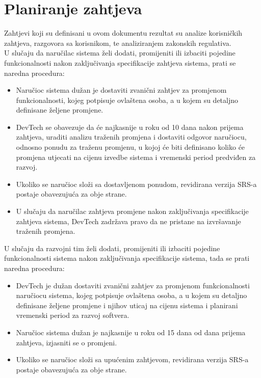 \section{Planiranje zahtjeva}
Zahtjevi koji su definisani u ovom dokumentu rezultat su analize korisničkih zahtjeva, razgovora sa korisnikom, te analiziranjem zakonskih regulativa. \\
U slučaju da naručilac sistema želi dodati, promijeniti ili izbaciti pojedine funkcionalnosti nakon zaključivanja specifikacije zahtjeva sistema, prati se naredna procedura:
\begin{itemize}
\item Naručioc sistema dužan je dostaviti zvanični zahtjev za promjenom funkcionalnosti, kojeg potpisuje ovlaštena osoba, a u kojem su detaljno definisane željene promjene.
\item DevTech se obavezuje da će najkasnije u roku od 10 dana nakon prijema zahtjeva, uraditi analizu traženih promjena i dostaviti odgovor naručiocu, odnosno ponudu za traženu promjenu, u kojoj će biti definisano koliko će promjena utjecati na cijenu izvedbe sistema i vremenski period predviđen za razvoj.
\item Ukoliko se naručioc složi sa dostavljenom ponudom, revidirana verzija SRS-a postaje obavezujuća za obje strane.
\item U slučaju da naručilac zahtjeva promjene nakon zaključivanja specifikacije zahtjeva sistema, DevTech zadržava pravo da ne pristane na izvršavanje traženih promjena.
\end{itemize}
U slučaju da razvojni tim želi dodati, promijeniti ili izbaciti pojedine funkcionalnosti sistema nakon zaključivanja specifikacije sistema, tada se prati naredna procedura:
\begin{itemize}
\item DevTech je dužan dostaviti zvanični zahtjev za promjenom funkcionalnosti naručiocu sistema, kojeg potpisuje ovlaštena osoba, a u kojem su detaljno definisane željene promjene i njihov uticaj na cijenu sistema i planirani vremenski period za razvoj softvera.
\item Naručioc sistema dužan je najkasnije u roku od 15 dana od dana prijema zahtjeva, izjasniti se o promjeni.
\item Ukoliko se naručioc složi sa upućenim zahtjevom, revidirana verzija SRS-a postaje obavezujuća za obje strane.
\end{itemize}